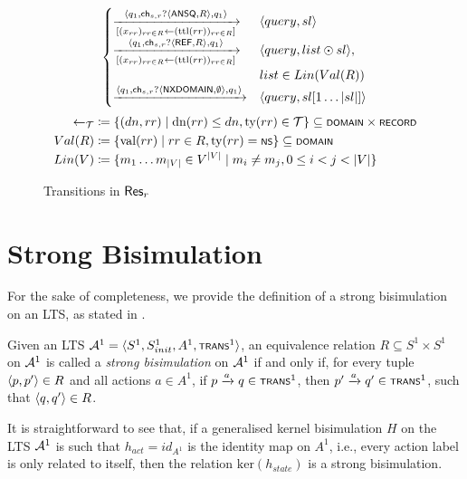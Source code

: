\documentclass[english,acmsmall, screen, nonacm]{acmart}
\theoremstyle{plain}
\theoremstyle{definition}
\theoremstyle{remark}
\renewcommand{\ker}[1]{\text{ker}(#1)}
\begin{document}
\begin{figure}[h]
\begin{gather}
\begin{align*}
\begin{cases}
				\xrightarrow[{[(x_{rr})_{rr\in R}\leftarrow (\text{ttl}(rr))_{rr\in R}]}]{\tup{q_1,\ch_{s,r}?\tup{\scrsf{ansq},R},q_1}} & \tup{query,sl}\\
				\xrightarrow[{[(x_{rr})_{rr\in R}\leftarrow (\text{ttl}(rr))_{rr\in R}]}]{\tup{q_1,\ch_{s,r}?\tup{\scrsf{ref},R},q_1}} & \tup{query,list \odot sl},\\
				& list \in Lin(Val(R))\\
				\xrightarrow{\tup{q_1, \ch_{s,r}?\tup{\scrsf{nxdomain},\emptyset}, q_1}} & \tup{query,sl[1\ldots |sl|]}
			\end{cases}
		\end{align*}
	\end{gather}
	\begin{align*}
		\leftarrow_{{\cal T}} & \coloneqq\{(dn,rr)\mid\text{dn}(rr)\leq dn,\text{ty}(rr)\in{\cal T}\}\subseteq\scrsf{domain}\times\scrsf{record}\\
		Val(R) & \coloneqq \{\text{val}(rr)\mid rr\in R,\text{ty}(rr)=\scrsf{ns}\} \subseteq \scrsf{domain}\\
		Lin(V) & \coloneqq \{m_1\ldots m_{|V|} \in V^{|V|} \mid m_i \neq m_j, 0 \leq i < j < |V| \}
	\end{align*}
	
	\caption{Transitions in $\rec{r}$}
\end{figure}

\newpage

\section{Strong Bisimulation}\label{appx:strong-bisim}

For the sake of completeness, we provide the definition of a strong bisimulation on an LTS, as stated in \cite{milner1989communication}.

\begin{definition}\label{def:strong-bisim}
	
	Given an LTS $\cal A^1 = \tup{S^1,S^1_{init},A^1,\trans^1}$, an equivalence relation $R \subseteq S^1 \times S^1$ on $\cal A^1$ is called a \emph{strong bisimulation} on $\cal A^1$ if and only if, for every tuple $\tup{p,p'}\in R$ and all actions $a \in A^1$, if $p \xrightarrow{a} q \in \trans^1$, then $p' \xrightarrow{a} q' \in \trans^1$, such that $\tup{q,q'}\in R$.
	
\end{definition}

It is straightforward to see that, if a generalised kernel bisimulation $H$ on the LTS $\cal A^1$ is such that $h_{act} = id_{A^1}$ is the identity map on $A^1$, i.e., every action label is only related to itself, then the relation $\ker{h_{state}}$ is a strong bisimulation.
\end{document}
